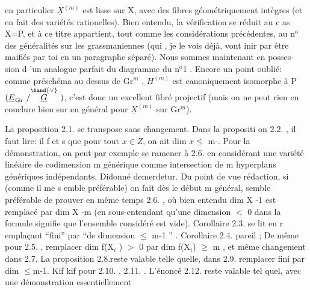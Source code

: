 
en particulier $\underline{X}^{(m)}$ est lisse sur X, avec des fibres géométriquement
intègres (et en fait des variétés rationelles). Bien entendu, la
vérification se réduit au c as X=P, et à ce titre appartient, tout
comme les considérations précédentes, au n$^{\text{o}}$ des généralités sur les
grassmaniennes (qui , je le vois déjà, vont inir par être maifiés
par toi en un paragraphe séparé). Nous sommes maintenant en posses-%
sion d 'un analogue parfait du diagramme du n$^{\text{o}}$1 . Encore un point
oublié: comme préschéma au dessus de Gr$^{m}$ , $\underline{H}^{(m)}$ est canoniquement
isomorphe à P$(\underline{E}_{\mathrm{Gr}}\ /\overset{\hand{\vee}}{\underline{G}}\ )$, c'est donc un excellent fibré projectif
(mais on ne peut rien en conclure bien sur en général pour $\underline{X}^{(m)}$ sur
Gr$^{m}$).

La proposition 2.1. se transpose sans changement. Dans la
propositi on 2.2. , il faut lire: il f et s que pour tout $x \in Z$, on
ait  dim $\overline{x} \leqslant$ m-. Pour la démonstration, on peut par exemple
se ramener à 2.6. en considérant une  variété linéaire de
codimension m générique comme intersection de m hyperplans génériques
indépendants, Didonné demerdetur. Du point de vue rédaction, si
(comme il me s emble préférable) on fait dès le début m général, 
semble préférable de prouver en même temps 2.6. , où bien entendu
dim X -1 est remplacé par dim X -m (en sous-entendant qu'une dimension
$<$ 0 dans la formule signifie que l'ensemble considéré est vide).
Corollaire 2.3. se lit en r emplaçant ``fini'' par ``de dimension $\leqslant$ 
m-1 '' . Corollaire 2.4. pareil ; De même pour 2.5. , remplacer
dim f(X$_{i}$ ) $>$ 0 par dim f(X$_{i}$) $\geqslant$ m , et même changement dans 2.7.
La proposition 2.8.reste valable telle quelle, dans 2.9. remplacer
fini par dim $\leqslant$m-1. Kif kif pour 2.10. , 2.11. . L'énoncé
2.12. reste valable tel quel, avec une démonstration essentiellement

